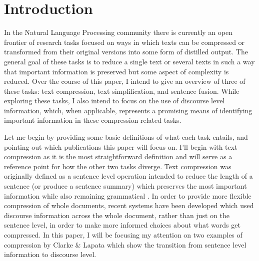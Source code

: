 \section{Introduction}

\iffalse
{Talk about what the three different categories are, and how they can be differentiated from each other.  (this should be about 2 paragraphs).  
Then talk about what commonalities each category has with the others(this can be again 1-2 paragraphs) }
\fi


{In the Natural Language Processing community there is currently an open frontier of research tasks focused on ways in which texts can be compressed or transformed from their original versions into some form of distilled output. The general goal of these tasks is to reduce a single text or several texts in such a way that important information is preserved but some aspect of complexity is reduced.  Over the course of this paper, I intend to give an overview of three of these tasks: text compression, text simplification, and sentence fusion. While exploring these tasks, I also intend to focus on the use of discourse level information, which, when applicable, represents a promising means of identifying important information in these compression related tasks.}

{Let me begin by providing some basic definitions of what each task entails, and pointing out which publications this paper will focus on. I'll begin with text compression as it is the most straightforward definition and will serve as a reference point for how the other two tasks diverge. Text compression was originally defined as a sentence level operation intended to reduce the length of a sentence (or produce a sentence summary) which preserves the most important information while also remaining grammatical \citet{Jing2000}.  In order to provide more flexible compression of whole documents, recent systems have been developed which used discourse information across the whole document, rather than just on the sentence level, in order to make more informed choices about what words get compressed.  In this paper, I will be focusing my attention on two examples of compression by Clarke \& Lapata which show the transition from sentence level information\citet{Clarke,Lapata2008}  to discourse level\citet{Clarke,Lapata2010}.}

